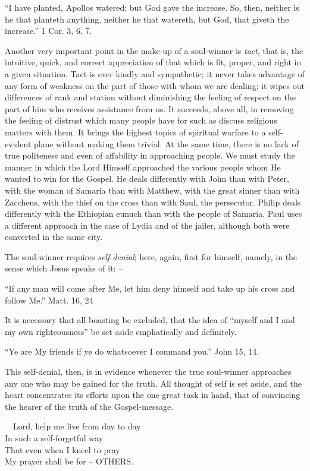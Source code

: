 \documentclass[
]{book}
\begin{document}
``I have planted, Apollos watered; but God gave the increase. So, then, neither is he that planteth anything, neither he that watereth, but God, that giveth the increase.'' 1 Cor. 3, 6. 7.

Another very important point in the make-up of a soul-winner is \emph{tact}, that is, the intuitive, quick, and correct appreciation of that which is fit, proper, and right in a given situation. Tact is ever kindly and sympathetic; it never takes advantage of any form of weakness on the part of those with whom we are dealing; it wipes out differences of rank and station without diminishing the feeling of respect on the part of him who receives assistance from us. It succeeds, above all, in removing the feeling of distrust which many people have for such as discuss religious matters with them. It brings the highest topics of spiritual warfare to a self-evident plane without making them trivial. At the same time, there is no lack of true politeness and even of affability in approaching people. We must study the manner in which the Lord Himself approached the various people whom He wanted to win for the Gospel. He deals differently with John than with Peter, with the woman of Samaria than with Matthew, with the great sinner than with Zaccheus, with the thief on the cross than with Saul, the persecutor. Philip deals differently with the Ethiopian eunuch than with the people of Samaria. Paul uses a different approach in the case of Lydia and of the jailer, although both were converted in the same city.

The soul-winner requires \emph{self-denial}; here, again, first for himself, namely, in the sense which Jesus speaks of it: --

``If any man will come after Me, let him deny himself and take up his cross and follow Me.'' Matt. 16, 24

It is necessary that all boasting be excluded, that the idea of ``myself and I and my own righteousness'' be set aside emphatically and definitely.

``Ye are My friends if ye do whatsoever I command you.'' John 15, 14.

This self-denial, then, is in evidence whenever the true soul-winner approaches any one who may be gained for the truth. All thought of self is set aside, and the heart concentrates its efforts upon the one great task in hand, that of convincing the hearer of the truth of the Gospel-message.

~~Lord, help me live from day to day\\
\hspace*{0.333em}\hspace*{0.333em}In such a self-forgetful way\\
\hspace*{0.333em}\hspace*{0.333em}That even when I kneel to pray\\
\hspace*{0.333em}\hspace*{0.333em}My prayer shall be for -- OTHERS.
\end{document}
